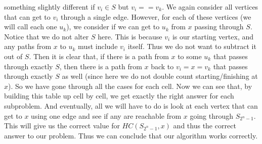 \documentclass{article}
\begin{document}
something slightly different if $v_i \in S$ but $v_i == v_k$. We again consider
all vertices that can get to $v_i$ through a single edge. However, for each of
these vertices (we will call each one $u_k$),
we consider if we can get to $u_k$ from $x$ passing through $S$.
Notice that we do not alter $S$ here. This is because $v_i$ is our starting
vertex, and any paths from $x$ to $u_k$ must include $v_i$ itself. Thus we do
not want to subtract it out of $S$. Then it is clear that, if there is a path
from $x$ to some $u_k$ that passes through exactly $S$, then there is a path
from $x$ back to $v_i=x=v_k$ that passes through exactly $S$ as well (since here we
do not double count starting/finishing at $x$). So we have gone through all the
cases for each cell. Now we can see that, by building this table up cell by
cell, we get exactly the right answer for each subproblem. And eventually, all
we will have to do is look at each vertex that can get to $x$ using one edge and
see if any are reachable from $x$ going through $S_{2^n - 1}$. This will give us
the correct value for $HC(S_{2^n - 1}, x)$ and thus the correct answer to our
problem. Thus we can conclude that our algorithm works correctly.
\newpage
\end{document}
